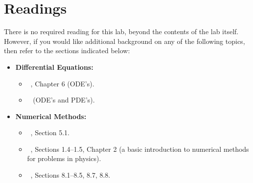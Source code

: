 % 
%
%
%
%
%
%
%

\section{Readings}

There is no required reading for this lab, beyond the contents of the
lab itself.  However, if you would like additional background on any
of the following topics, then refer to the sections indicated below:

\begin{itemize}
\item[\ ] {\bf Differential Equations:}  
  \begin{itemize}
  \item ~\cite{strang-am}, Chapter 6 (ODE's).
  \item ~\cite{boyce-diprima} (ODE's and PDE's).
  \end{itemize}
\item[\ ] {\bf Numerical Methods:}
  \begin{itemize}
  \item ~\cite{strang-am}, Section 5.1.
  \item ~\cite{garcia}, Sections 1.4--1.5, Chapter 2 (a basic
    introduction to numerical methods for problems in physics).
  \item ~\cite{boyce-diprima}, Sections 8.1--8.5, 8.7, 8.8.
  \end{itemize}
\end{itemize}


